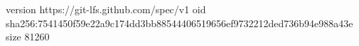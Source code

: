 version https://git-lfs.github.com/spec/v1
oid sha256:7541450f59e22a9c174dd3bb88544406519656ef9732212ded736b94e988a43e
size 81260
